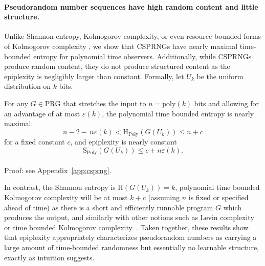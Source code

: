 \documentclass[twoside]{article}
\newcommand{\rH}{\mathrm{H}}
\newcommand{\rS}{\mathrm{S}}
\begin{document}
\paragraph{Pseudorandom number sequences have high random content and little structure.} 
Unlike Shannon entropy, Kolmogorov complexity, or even resource bounded forms of Kolmogorov complexity \citep{allender2011pervasive}, we show that CSPRNGs have nearly maximal time-bounded entropy for polynomial time observers. Additionally, while CSPRNGs produce random content, they do not produce structured content as the epiplexity is negligibly larger than constant.
%
%
%
%
Formally, let $U_k$ be the uniform distribution on $k$ bits.%

\begin{theorem}
\label{thm:csprng_entropy}
For any $G \in \mathrm{PRG}$ that stretches the input to $n=\mathrm{poly}(k)$ bits and allowing for an advantage of at most $\varepsilon(k)$, the polynomial time bounded entropy is nearly maximal:
$$
    n - 2 - \,n\varepsilon(k) < \mathrm{H}_{\mathrm{Poly}}(G(U_k)) \le n+c
$$
for a fixed constant $c$, and epiplexity is nearly constant
$$
\rS_{\mathrm{Poly}}(G(U_k)) \leq c + n\varepsilon(k).
$$
%
\\
Proof: see Appendix~\ref{app:csprng}.
\end{theorem}
In contrast, the Shannon entropy is $\rH(G(U_k))=k$, polynomial time bounded Kolmogorov complexity will be at most $k+c$ (assuming $n$ is fixed or specified ahead of time) as there is a short and efficiently runnable program $G$ which produces the output, and similarly with other notions such as Levin complexity~\citep{LiVitanyi2008} or time bounded Kolmogorov complexity~\citep{allender2011pervasive}. Taken together, these results show that epiplexity appropriately characterizes pseudorandom numbers as carrying a large amount of time-bounded randomness but essentially no learnable structure, exactly as intuition suggests.
\end{document}
